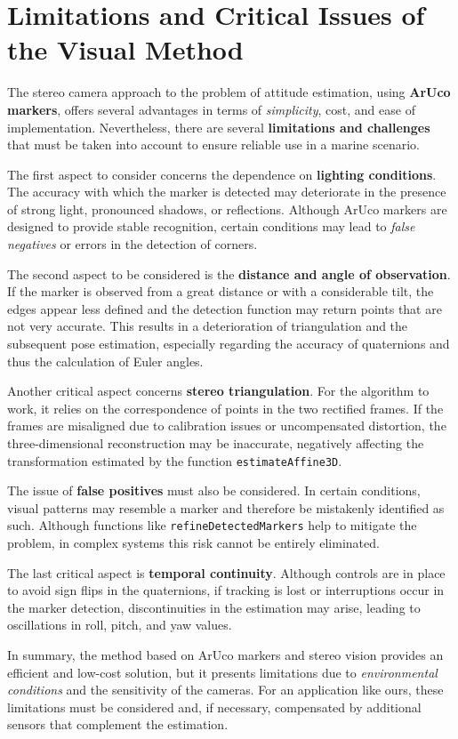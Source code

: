 \section[Limitations and Critical Issues]{Limitations and Critical Issues of the Visual Method}

The stereo camera approach to the problem of attitude estimation, using \textbf{ArUco markers}, offers several advantages in terms of \textit{simplicity}, cost, and ease of implementation. Nevertheless, there are several \textbf{limitations and challenges} that must be taken into account to ensure reliable use in a marine scenario.

The first aspect to consider concerns the dependence on \textbf{lighting conditions}. The accuracy with which the marker is detected may deteriorate in the presence of strong light, pronounced shadows, or reflections. Although ArUco markers are designed to provide stable recognition, certain conditions may lead to \textit{false negatives} or errors in the detection of corners.

The second aspect to be considered is the \textbf{distance and angle of observation}. If the marker is observed from a great distance or with a considerable tilt, the edges appear less defined and the detection function may return points that are not very accurate. This results in a deterioration of triangulation and the subsequent pose estimation, especially regarding the accuracy of quaternions and thus the calculation of Euler angles.

Another critical aspect concerns \textbf{stereo triangulation}. For the algorithm to work, it relies on the correspondence of points in the two rectified frames. If the frames are misaligned due to calibration issues or uncompensated distortion, the three-dimensional reconstruction may be inaccurate, negatively affecting the transformation estimated by the function \texttt{estimateAffine3D}.

The issue of \textbf{false positives} must also be considered. In certain conditions, visual patterns may resemble a marker and therefore be mistakenly identified as such. Although functions like \texttt{refineDetectedMarkers} help to mitigate the problem, in complex systems this risk cannot be entirely eliminated.

The last critical aspect is \textbf{temporal continuity}. Although controls are in place to avoid sign flips in the quaternions, if tracking is lost or interruptions occur in the marker detection, discontinuities in the estimation may arise, leading to oscillations in roll, pitch, and yaw values.

In summary, the method based on ArUco markers and stereo vision provides an efficient and low-cost solution, but it presents limitations due to \textit{environmental conditions} and the sensitivity of the cameras. For an application like ours, these limitations must be considered and, if necessary, compensated by additional sensors that complement the estimation.
